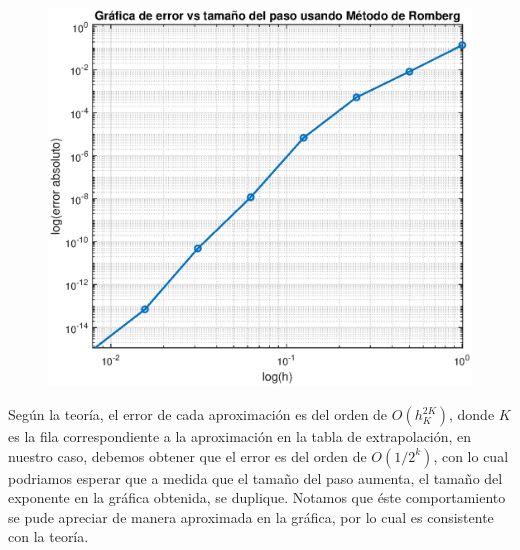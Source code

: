 \begin{itemize}
\begin{solution}
        \begin{figure}[H]
        \centering
        \includegraphics[scale=0.65]{Graficas/Punto_5_b.eps}
        \end{figure}  

        Según la teoría, el error de cada aproximación es del orden de $O(h_K^{2K})$, donde $K$ es la fila correspondiente a la aproximación en la tabla de extrapolación, en nuestro caso,  debemos obtener que el error es del orden de $O(1/2^k)$, con lo cual podriamos esperar que a medida que el tamaño del paso aumenta, el tamaño del exponente en la gráfica obtenida, se duplique. Notamos que éste comportamiento se pude apreciar de manera aproximada en la gráfica, por lo cual es consistente con la teoría.
    \end{solution}    
\end{itemize}
